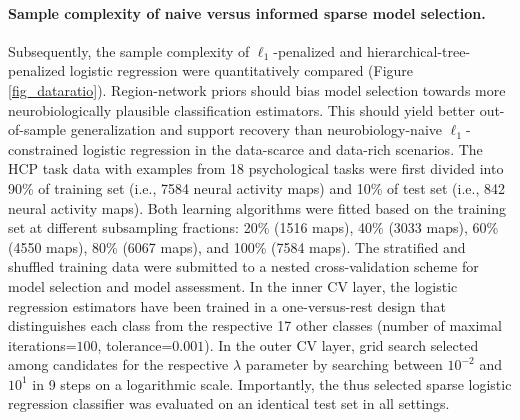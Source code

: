 \documentclass{article}
\begin{document}
\paragraph{Sample complexity of naive versus informed sparse model selection.}
Subsequently, the sample complexity of
$\ell_1$-penalized and hierarchical-tree-penalized logistic regression
were quantitatively compared (Figure \ref{fig_dataratio}).
Region-network priors should bias model selection towards more
neurobiologically plausible classification estimators.
This should yield better out-of-sample generalization and
support recovery than
neurobiology-naive $\ell_1$-constrained logistic regression
in the data-scarce and data-rich scenarios.
%
The HCP task data with examples from 18
psychological tasks were first divided into
90\% of training set (i.e., 7584 neural activity maps) and
10\% of test set (i.e., 842 neural activity maps).
Both learning algorithms were fitted based on the
training set at different subsampling fractions:
20\% (1516 maps),
40\% (3033 maps),
60\% (4550 maps),
80\% (6067 maps), and
100\% (7584 maps).
%
The stratified and shuffled training data were submitted
to a nested cross-validation scheme
for model selection and model assessment.
In the inner CV layer, the logistic regression estimators
have been trained in a one-versus-rest design that
distinguishes each class from
the respective 17 other classes
(number of maximal iterations=$100$, tolerance=$0.001$).
In the outer CV layer, grid search
selected among candidates for the respective $\lambda$ parameter
by searching between $10^{-2}$ and $10^{1}$ in 9 steps on a logarithmic scale.
Importantly, the thus selected sparse logistic regression classifier was
evaluated on an identical test set in all settings.
\end{document}

